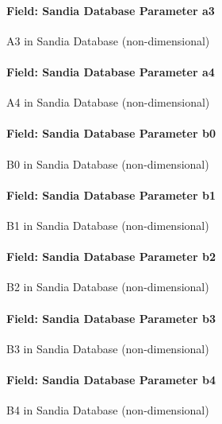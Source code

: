 \paragraph{Field: Sandia Database Parameter a3}\label{field-sandia-database-parameter-a3}

A3 in Sandia Database (non-dimensional)

\paragraph{Field: Sandia Database Parameter a4}\label{field-sandia-database-parameter-a4}

A4 in Sandia Database (non-dimensional)

\paragraph{Field: Sandia Database Parameter b0}\label{field-sandia-database-parameter-b0}

B0 in Sandia Database (non-dimensional)

\paragraph{Field: Sandia Database Parameter b1}\label{field-sandia-database-parameter-b1}

B1 in Sandia Database (non-dimensional)

\paragraph{Field: Sandia Database Parameter b2}\label{field-sandia-database-parameter-b2}

B2 in Sandia Database (non-dimensional)

\paragraph{Field: Sandia Database Parameter b3}\label{field-sandia-database-parameter-b3}

B3 in Sandia Database (non-dimensional)

\paragraph{Field: Sandia Database Parameter b4}\label{field-sandia-database-parameter-b4}

B4 in Sandia Database (non-dimensional)

